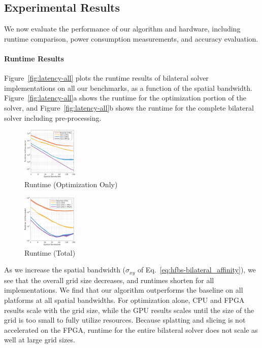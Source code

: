 \subsection{Experimental Results}

We now evaluate the performance of our algorithm and hardware, including runtime comparison, power consumption measurements, and accuracy evaluation.

\paragraph{Runtime Results}

Figure~\ref{fig:latency-all} plots the runtime results of bilateral solver implementations on all our benchmarks, as a function of the spatial bandwidth.
Figure~\ref{fig:latency-all}a shows the runtime for the optimization portion of the solver, and Figure~\ref{fig:latency-all}b shows the runtime for the complete bilateral solver including pre-processing.

  \begin{figure}[h!]
    \includegraphics[width=0.235\textwidth]{hfbs-figs/runtime_opt.png}
    \caption{Runtime (Optimization Only)}
  \end{figure}
  \begin{figure}[h!]
    \includegraphics[width=0.235\textwidth]{hfbs-figs/runtime_total.png}
    \caption{Runtime (Total)}
  \end{figure}


As we increase the spatial bandwidth ($\sigma_{xy}$ of Eq.~\ref{eq:hfbs-bilateral_affinity}), we see that the overall grid size decreases, and runtimes shorten for all implementations.
We find that our algorithm outperforms the baseline on all platforms at all spatial bandwidths.
For optimization alone, CPU and FPGA results scale with the grid size, while the GPU results scales until the size of the grid is too small to fully utilize resources.
Because splatting and slicing is not accelerated on the FPGA, runtime for the entire bilateral solver does not scale as well at large grid sizes.

